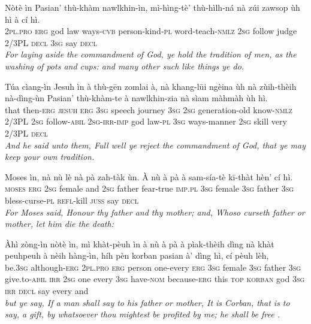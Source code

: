\documentclass[11pt,a4paper]{article}
\begin{document}
\begin{exe}
\gll Nòtè ìn Pasian' thù-khàm nawlkhin-ìn, mì-hìng-tè' thù-hìlh-ná nà zúi zawsop ùh hì à cí hì. \\
     \textsc{2pl}.\textsc{pro} \textsc{erg} god law ways-\textsc{cvb} person-kind-\textsc{pl} word-teach-\textsc{nmlz} \textsc{2sg} follow judge 2/3PL \textsc{decl} \textsc{3sg} say \textsc{decl} \\
\glt \textcolor{kjvcolor}{\textit{For laying aside the commandment of God, ye hold the tradition of men, as the washing of pots and cups: and many other such like things ye do.}}

\gll Túa cìang-ìn Jesuh ìn à thù-gēn zomlai à, nà khang-lūi ngèina ùh nà zùih-thèih nà-dìng-ùn Pasian' thù-khàm-te à nawlkhin-zia nà sìam màhmàh ùh hì. \\
     that then-\textsc{erg} \textsc{jesuh} \textsc{erg} \textsc{3sg} speech journey \textsc{3sg} \textsc{2sg} generation-old know-\textsc{nmlz} 2/3PL \textsc{2sg} follow-\textsc{abil} \textsc{2sg}-\textsc{irr}-\textsc{imp} god law-\textsc{pl} \textsc{3sg} ways-manner \textsc{2sg} skill very 2/3PL \textsc{decl} \\
\glt \textcolor{kjvcolor}{\textit{And he said unto them, Full well ye reject the commandment of God, that ye may keep your own tradition.}}

\gll Moses ìn, nà nù lè nà pà zah-tàk ùn. À nù à pà à sam-sía-tè kī-thàt hèn' cí hì. \\
     \textsc{moses} \textsc{erg} \textsc{2sg} female and \textsc{2sg} father fear-true \textsc{imp}.\textsc{pl} \textsc{3sg} female \textsc{3sg} father \textsc{3sg} bless-curse-\textsc{pl} \textsc{refl}-kill \textsc{juss} say \textsc{decl} \\
\glt \textcolor{kjvcolor}{\textit{For Moses said, Honour thy father and thy mother; and, Whoso curseth father or mother, let him die the death:}}

\gll Àhì zòng-ìn nòtè ìn, mì khàt-pèuh ìn à nù à pà à pìak-thèih dìng nà khàt peuhpeuh à nèih hàng-ìn, híh pèn korban pasian à' dìng hì, cí pèuh lèh, \\
     be.\textsc{3sg} although-\textsc{erg} \textsc{2pl}.\textsc{pro} \textsc{erg} person one-every \textsc{erg} \textsc{3sg} female \textsc{3sg} father \textsc{3sg} give.to-\textsc{abil} \textsc{irr} \textsc{2sg} one every \textsc{3sg} have-\textsc{nom} because-\textsc{erg} this \textsc{top} \textsc{korban} god \textsc{3sg} \textsc{irr} \textsc{decl} say every and \\
\glt \textcolor{kjvcolor}{\textit{but ye say, If a man shall say to his father or mother, It is Corban, that is to say, a gift, by whatsoever thou mightest be profited by me; he shall be free .}}


\end{exe}
\end{document}
